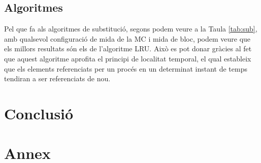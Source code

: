 \documentclass{article}
\begin{document}
\subsection{Algoritmes}
Pel que fa als algoritmes de substitució, segons podem veure a la Taula \ref{tab:sub}, amb qualsevol
 configuració de mida de la MC i mida de bloc, podem veure que els millors resultats són els de l'algoritme LRU.
 Això es pot donar gràcies al fet que aquest algoritme aprofita el principi de localitat temporal, el qual estableix 
que els elements referenciats per un procés en un determinat instant de temps tendiran a ser referenciats de nou.\\
\section{Conclusió}
\section{Annex}
\end{document}
